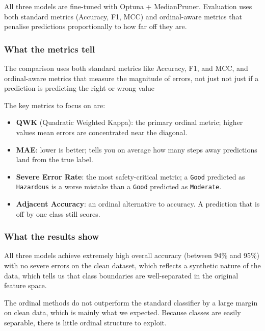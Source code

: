 \documentclass[a4paper,12pt]{article}
\begin{document}
	\bigskip
	
	All three models are fine-tuned with Optuna + MedianPruner. Evaluation uses both
	standard metrics (Accuracy, F1, MCC) and ordinal-aware metrics that penalise
	predictions proportionally to how far off they are.
	
	
	
	
	\subsubsection{What the metrics tell}
	
	The comparison uses both standard metrics like Accuracy, F1, and MCC, and ordinal-aware metrics that measure the magnitude of errors, not just not just if a prediction is predicting the right or wrong value
	
	The key metrics to focus on are:
	
	\begin{itemize}
		\item \textbf{QWK} (Quadratic Weighted Kappa): the primary ordinal metric; higher values
		mean errors are concentrated near the diagonal.
		\item \textbf{MAE}: lower is better; tells you on average how many steps away predictions
		land from the true label.
		\item \textbf{Severe Error Rate}: the most safety-critical metric; a \texttt{Good}
		predicted as \texttt{Hazardous} is a worse mistake than a \texttt{Good} predicted
		as \texttt{Moderate}.
		\item \textbf{Adjacent Accuracy}: an ordinal alternative to accuracy. A prediction that is
		off by one class still scores.
	\end{itemize}
	
	\subsubsection{What the results show}
	
	All three models achieve extremely high overall accuracy (between 94\% and 95\%) with no severe errors on the clean dataset, which reflects a synthetic nature of the data, which tells us that class boundaries are well-separated in the original feature space.
	
	The ordinal methods do not outperform the standard classifier by a large margin on clean data,
	which is mainly what we expected. Because classes are easily separable, there is little
	ordinal structure to exploit.
	
\end{document}

